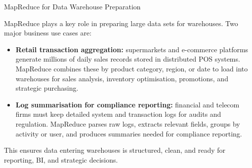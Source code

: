 \documentclass[aspectratio=169, table]{beamer}
\begin{document}
\begin{frame}{MapReduce for Data Warehouse Preparation}
	\vspace{20pt}
	
	MapReduce plays a key role in preparing large data sets for warehouses. Two major business use cases are:
	
	\begin{itemize}
		\item \textbf{Retail transaction aggregation:} supermarkets and e-commerce platforms generate millions of daily sales records stored in distributed POS systems. MapReduce combines these by product category, region, or date to load into warehouses for sales analysis, inventory optimisation, promotions, and strategic purchasing.
		
		\item \textbf{Log summarisation for compliance reporting:} financial and telecom firms must keep detailed system and transaction logs for audits and regulation. MapReduce parses raw logs, extracts relevant fields, groups by activity or user, and produces summaries needed for compliance reporting.
	\end{itemize}
	
	This ensures data entering warehouses is structured, clean, and ready for reporting, BI, and strategic decisions.
	
\end{frame}
\end{document}
